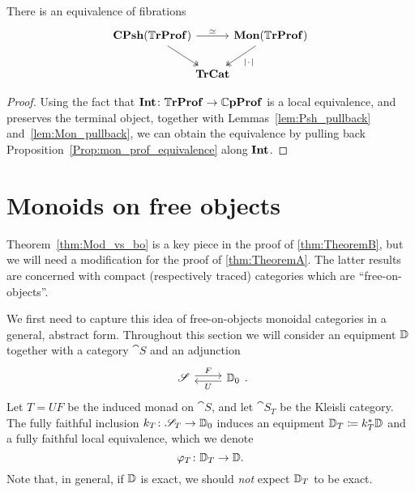 \documentclass[11pt,oneside,article]{memoir}
\begin{document}
\begin{corollary}
      \label{cor:Tr_mon_prof_equivalence}
   There is an equivalence of fibrations
   \[ \begin{tikzcd}[column sep=-.5em]
      \CPsh(\dTrProf) \ar[rr,"\equiv"] \ar[dr,two heads]
         && \Mon(\dTrProf) \ar[dl,two heads,"\MOb"] \\
         & \TrCat &
   \end{tikzcd} \]
\end{corollary}
\begin{proof}
   Using the fact that $\mathbf{Int}\colon\mathbb{T}\mathbf{rProf}\to\mathbb{C}\mathbf{pProf}$ is a local equivalence, and preserves the
   terminal object, together with Lemmas~\ref{lem:Psh_pullback} and~\ref{lem:Mon_pullback}, we can
   obtain the equivalence by pulling back Proposition~\ref{Prop:mon_prof_equivalence} along $\mathbf{Int}$.
\end{proof}

\section{Monoids on free objects}
      \label{sec:monoids_on_free}

Theorem~\ref{thm:Mod_vs_bo} is a key piece in the proof of \ref{thm:TheoremB}, but we will need a
modification for the proof of \ref{thm:TheoremA}. The latter results are concerned with compact
(respectively traced) categories which are ``free-on-objects''.

We first need to capture this idea of free-on-objects monoidal categories in a general, abstract form.
Throughout this section we will consider an equipment $\mathbb{D}$ together with a category $\cat{S}$
and an adjunction
\begin{equation}
      \label{eqn:adjunction_objectfree}
   \Adjoint{\cat{S}}{\dcat{D}_0}{F}{U}.
\end{equation}
Let $T=UF$ be the induced monad on $\cat{S}$, and let $\cat{S}_T$ be the Kleisli category. The fully
faithful inclusion $k_T\colon\mathscr{S}_T\to\mathbb{D}_0$ induces an equipment $\mathbb{D}_T\coloneqq
k_T^*\mathbb{D}$ and a fully faithful local equivalence, which we denote
\begin{equation}
      \label{eqn:FFLE_DT}
   \varphi_T\colon \mathbb{D}_T\to\mathbb{D}.
\end{equation}
Note that, in general, if $\mathbb{D}$ is exact, we should \emph{not} expect $\mathbb{D}_T$ to be exact.
\end{document}
